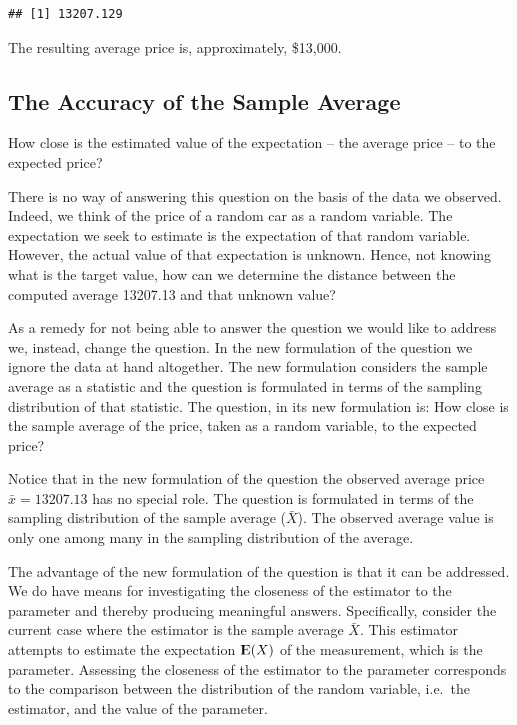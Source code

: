 \documentclass[]{krantz}
\makeatletter
\newenvironment{Shaded}{\begin{snugshade}}{\end{snugshade}}
\newcommand{\DataTypeTok}[1]{\textcolor[rgb]{0.13,0.29,0.53}{#1}}
\newcommand{\KeywordTok}[1]{\textcolor[rgb]{0.13,0.29,0.53}{\textbf{#1}}}
\newcommand{\NormalTok}[1]{#1}
\newcommand{\OperatorTok}[1]{\textcolor[rgb]{0.81,0.36,0.00}{\textbf{#1}}}
\newcommand{\OtherTok}[1]{\textcolor[rgb]{0.56,0.35,0.01}{#1}}
\newcommand{\Expec}{{\rm I\kern-.3em E}}
\newenvironment{kframe}{%
\medskip{}
\setlength{\fboxsep}{.8em}
 \def\at@end@of@kframe{}%
 \ifinner\ifhmode%
  \def\at@end@of@kframe{\end{minipage}}%
  \begin{minipage}{\columnwidth}%
 \fi\fi%
 \def\FrameCommand##1{\hskip\@totalleftmargin \hskip-\fboxsep
 \colorbox{shadecolor}{##1}\hskip-\fboxsep
     \hskip-\linewidth \hskip-\@totalleftmargin \hskip\columnwidth}%
 \MakeFramed {\advance\hsize-\width
   \@totalleftmargin\z@ \linewidth\hsize
   \@setminipage}}%
 {\par\unskip\endMakeFramed%
 \at@end@of@kframe}
\renewenvironment{Shaded}{\begin{kframe}}{\end{kframe}}
\theoremstyle{definition}
\theoremstyle{definition}
\theoremstyle{definition}
\theoremstyle{remark}
\makeatother
\begin{document}
\begin{Shaded}
\end{Shaded}

\begin{verbatim}
## [1] 13207.129
\end{verbatim}

The resulting average price is, approximately, \$13,000.

\hypertarget{the-accuracy-of-the-sample-average}{%
\subsection{The Accuracy of the Sample Average}\label{the-accuracy-of-the-sample-average}}

How close is the estimated value of the expectation -- the average price
-- to the expected price?

There is no way of answering this question on the basis of the data we
observed. Indeed, we think of the price of a random car as a random
variable. The expectation we seek to estimate is the expectation of that
random variable. However, the actual value of that expectation is
unknown. Hence, not knowing what is the target value, how can we
determine the distance between the computed average 13207.13 and that
unknown value?

As a remedy for not being able to answer the question we would like to
address we, instead, change the question. In the new formulation of the
question we ignore the data at hand altogether. The new formulation
considers the sample average as a statistic and the question is
formulated in terms of the sampling distribution of that statistic. The
question, in its new formulation is: How close is the sample average of
the price, taken as a random variable, to the expected price?

Notice that in the new formulation of the question the observed average
price \(\bar x = 13207.13\) has no special role. The question is
formulated in terms of the sampling distribution of the sample average
(\(\bar X\)). The observed average value is only one among many in the
sampling distribution of the average.

The advantage of the new formulation of the question is that it can be
addressed. We do have means for investigating the closeness of the
estimator to the parameter and thereby producing meaningful answers.
Specifically, consider the current case where the estimator is the
sample average \(\bar X\). This estimator attempts to estimate the
expectation \(\Expec(X)\) of the measurement, which is the parameter.
Assessing the closeness of the estimator to the parameter corresponds to
the comparison between the distribution of the random variable, i.e.~the
estimator, and the value of the parameter.
\end{document}
